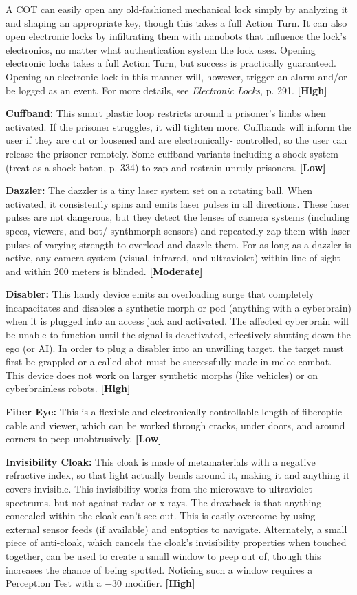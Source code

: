 A COT can easily open any old-fashioned mechanical lock simply by analyzing it and shaping an appropriate key, though this takes a full Action Turn. It can also open electronic locks by infiltrating them with nanobots that influence the lock’s electronics, no matter what authentication system the lock uses. Opening electronic locks takes a full Action Turn, but success is practically guaranteed. Opening an electronic lock in this manner will, however, trigger an alarm and/or be logged as an event. For more details, see \emph{Electronic Locks}, p. 291. \textbf{[High]} 

\textbf{Cuffband:} This smart plastic loop restricts around a prisoner’s limbs when activated. If the prisoner struggles, it will tighten more. Cuffbands will inform the user if they are cut or loosened and are electronically- controlled, so the user can release the prisoner remotely. Some cuffband variants including a shock system (treat as a shock baton, p. 334) to zap and restrain unruly prisoners. \textbf{[Low]} 

\textbf{Dazzler:} The dazzler is a tiny laser system set on a rotating ball. When activated, it consistently spins and emits laser pulses in all directions. These laser pulses are not dangerous, but they detect the lenses of camera systems (including specs, viewers, and bot/ synthmorph sensors) and repeatedly zap them with laser pulses of varying strength to overload and dazzle them. For as long as a dazzler is active, any camera system (visual, infrared, and ultraviolet) within line of sight and within 200 meters is blinded. \textbf{[Moderate]} 

\textbf{Disabler:} This handy device emits an overloading surge that completely incapacitates and disables a synthetic morph or pod (anything with a cyberbrain) when it is plugged into an access jack and activated. The affected cyberbrain will be unable to function until the signal is deactivated, effectively shutting down the ego (or AI). In order to plug a disabler into an unwilling target, the target must first be grappled or a called shot must be successfully made in melee combat. This device does not work on larger synthetic morphs (like vehicles) or on cyberbrainless robots. \textbf{[High]} 

\textbf{Fiber Eye:} This is a flexible and electronically-controllable length of fiberoptic cable and viewer, which can be worked through cracks, under doors, and around corners to peep unobtrusively. \textbf{[Low]} 

\textbf{Invisibility Cloak:} This cloak is made of metamaterials with a negative refractive index, so that light actually bends around it, making it and anything it covers invisible. This invisibility works from the microwave to ultraviolet spectrums, but not against radar or x-rays. The drawback is that anything concealed within the cloak can’t see out. This is easily overcome by using external sensor feeds (if available) and entoptics to navigate. Alternately, a small piece of anti-cloak, which cancels the cloak’s invisibility properties when touched together, can be used to create a small window to peep out of, though this increases the chance of being spotted. Noticing such a window requires a Perception Test with a $-$30 modifier. \textbf{[High]} 

